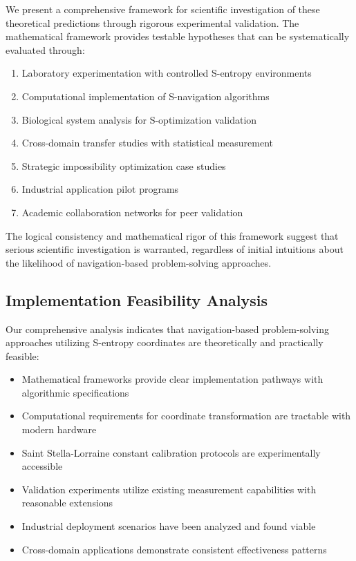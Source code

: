 \documentclass[11pt]{article}
\theoremstyle{definition}
\theoremstyle{remark}
\begin{document}
We present a comprehensive framework for scientific investigation of these theoretical predictions through rigorous experimental validation. The mathematical framework provides testable hypotheses that can be systematically evaluated through:

\begin{enumerate}
\item Laboratory experimentation with controlled S-entropy environments
\item Computational implementation of S-navigation algorithms
\item Biological system analysis for S-optimization validation
\item Cross-domain transfer studies with statistical measurement
\item Strategic impossibility optimization case studies
\item Industrial application pilot programs
\item Academic collaboration networks for peer validation
\end{enumerate}

The logical consistency and mathematical rigor of this framework suggest that serious scientific investigation is warranted, regardless of initial intuitions about the likelihood of navigation-based problem-solving approaches.

\subsection{Implementation Feasibility Analysis}

Our comprehensive analysis indicates that navigation-based problem-solving approaches utilizing S-entropy coordinates are theoretically and practically feasible:

\begin{itemize}
\item Mathematical frameworks provide clear implementation pathways with algorithmic specifications
\item Computational requirements for coordinate transformation are tractable with modern hardware
\item Saint Stella-Lorraine constant calibration protocols are experimentally accessible
\item Validation experiments utilize existing measurement capabilities with reasonable extensions
\item Industrial deployment scenarios have been analyzed and found viable
\item Cross-domain applications demonstrate consistent effectiveness patterns
\end{itemize}
\end{document}
